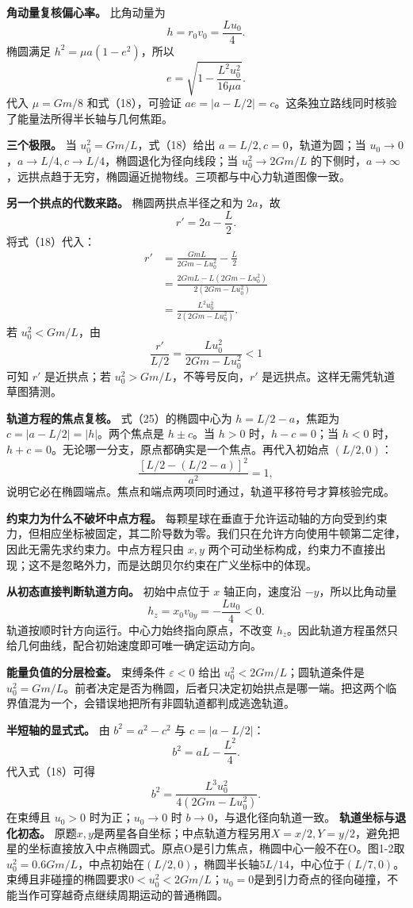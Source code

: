 \documentclass[12pt,a4paper,UTF8]{ctexart}
\begin{document}
\textbf{角动量复核偏心率。} 比角动量为 \[
h=r_0v_0=\frac{Lu_0}{4}. \tag{26}
\] 椭圆满足 \(h^2=\mu a(1-e^2)\)，所以 \[
e=\sqrt{1-\frac{L^2u_0^2}{16\mu a}}. \tag{27}
\] 代入 \(\mu=Gm/8\) 和式（18），可验证
\(ae=|a-L/2|=c\)。这条独立路线同时核验了能量法所得半长轴与几何焦距。

\textbf{三个极限。} 当 \(u_0^2=Gm/L\)，式（18）给出
\(a=L/2,c=0\)，轨道为圆；当
\(u_0\to0\)，\(a\to L/4,c\to L/4\)，椭圆退化为径向线段；当
\(u_0^2\to2Gm/L\)
的下侧时，\(a\to\infty\)，远拱点趋于无穷，椭圆逼近抛物线。三项都与中心力轨道图像一致。

\textbf{另一个拱点的代数来路。} 椭圆两拱点半径之和为 \(2a\)，故 \[
r'=2a-\frac L2. \tag{28}
\] 将式（18）代入： \[
\begin{aligned}
r'
&=\frac{GmL}{2Gm-Lu_0^2}-\frac L2\\
&=\frac{2GmL-L(2Gm-Lu_0^2)}{2(2Gm-Lu_0^2)}\\
&=\frac{L^2u_0^2}{2(2Gm-Lu_0^2)}.
\end{aligned} \tag{29}
\] 若 \(u_0^2<Gm/L\)，由 \[
\frac{r'}{L/2}=\frac{Lu_0^2}{2Gm-Lu_0^2}<1 \tag{30}
\] 可知 \(r'\) 是近拱点；若 \(u_0^2>Gm/L\)，不等号反向，\(r'\)
是远拱点。这样无需凭轨道草图猜测。

\textbf{轨道方程的焦点复核。} 式（25）的椭圆中心为 \(h=L/2-a\)，焦距为
\(c=|a-L/2|=|h|\)。两个焦点是 \(h\pm c\)。当 \(h>0\) 时，\(h-c=0\)；当
\(h<0\) 时，\(h+c=0\)。无论哪一分支，原点都确实是一个焦点。再代入初始点
\((L/2,0)\)： \[
\frac{[L/2-(L/2-a)]^2}{a^2}=1, \tag{31}
\]
说明它必在椭圆端点。焦点和端点两项同时通过，轨道平移符号才算核验完成。

\textbf{约束力为什么不破坏中点方程。}
每颗星球在垂直于允许运动轴的方向受到约束力，但相应坐标被固定，其二阶导数为零。我们只在允许方向使用牛顿第二定律，因此无需先求约束力。中点方程只由
\(x,y\)
两个可动坐标构成，约束力不直接出现；这不是忽略外力，而是达朗贝尔约束在广义坐标中的体现。

\textbf{从初态直接判断轨道方向。} 初始中点位于 \(x\) 轴正向，速度沿
\(-y\)，所以比角动量 \[
h_z=x_0v_{0y}=-\frac{Lu_0}{4}<0. \tag{32}
\] 轨道按顺时针方向运行。中心力始终指向原点，不改变
\(h_z\)。因此轨道方程虽然只给几何曲线，配合初始速度即可唯一确定运动方向。

\textbf{能量负值的分层检查。} 束缚条件 \(\varepsilon<0\) 给出
\(u_0^2<2Gm/L\)；圆轨道条件是
\(u_0^2=Gm/L\)。前者决定是否为椭圆，后者只决定初始拱点是哪一端。把这两个临界值混为一个，会错误地把所有非圆轨道都判成逃逸轨道。

\textbf{半短轴的显式式。} 由 \(b^2=a^2-c^2\) 与 \(c=|a-L/2|\)： \[
b^2=aL-\frac{L^2}{4}. \tag{33}
\] 代入式（18）可得 \[
b^2=\frac{L^3u_0^2}{4(2Gm-Lu_0^2)}. \tag{34}
\] 在束缚且 \(u_0>0\) 时为正；\(u_0\to0\) 时
\(b\to0\)，与退化径向轨道一致。 \textbf{轨道坐标与退化初态。}
原题\(x,y\)是两星各自坐标；中点轨道方程另用\(X=x/2,Y=y/2\)，避免把星的坐标直接放入中点椭圆式。原点O是引力焦点，椭圆中心一般不在O。图1-2取\(u_0^2=0.6Gm/L\)，中点初始在\((L/2,0)\)，椭圆半长轴\(5L/14\)，中心位于\((L/7,0)\)。束缚且非碰撞的椭圆要求\(0<u_0^2<2Gm/L\)；\(u_0=0\)是到引力奇点的径向碰撞，不能当作可穿越奇点继续周期运动的普通椭圆。
\end{document}
